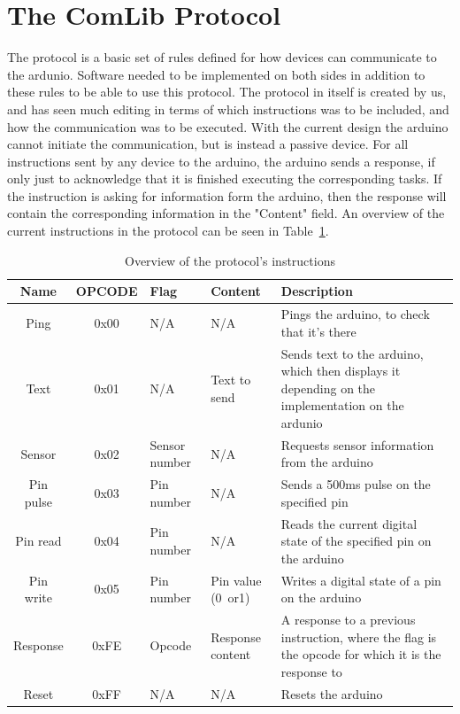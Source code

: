 \section{The ComLib Protocol}

The protocol is a basic set of rules defined for how devices can communicate to the ardunio. Software needed to be implemented on both sides in addition to these rules to be able to use this protocol. The protocol in itself is created by us, and has seen much editing in terms of which instructions was to be included, and how the communication was to be executed. With the current design the arduino cannot initiate the communication, but is instead a passive device. For all instructions sent by any device to the arduino, the arduino sends a response, if only just to acknowledge that it is finished executing the corresponding tasks. If the instruction is asking for information form the arduino, then the response will contain the corresponding information in the "Content" field. An overview of the current instructions in the protocol can be seen in Table~\ref{tbl:opcodes}.

\begin{table}
	\begin{tabular}{ | c | c | p{1.5cm} | p{1.7cm} | p{6cm} |}
		\hline
		\textbf{Name} & \textbf{OPCODE} & \textbf{Flag} & \textbf{Content} & \textbf{Description} \\ \hline
		Ping & 0x00 & N/A & N/A & Pings the arduino, to check that it's there \\ \hline
		Text & 0x01 & N/A & Text to send & Sends text to the arduino, which then displays it depending on the implementation on the ardunio \\ \hline
		Sensor & 0x02 & Sensor number & N/A & Requests sensor information from the arduino \\ \hline
		Pin pulse & 0x03 & Pin number & N/A & Sends a 500ms pulse on the specified pin \\ \hline
		Pin read & 0x04 & Pin number & N/A & Reads the current digital state of the specified pin on the arduino \\ \hline
		Pin write & 0x05 & Pin number & Pin value (0~or1) & Writes a digital state of a pin on the arduino \\ \hline
		Response & 0xFE & Opcode & Response content & A response to a previous instruction, where the flag is the opcode for which it is the response to \\ \hline
		Reset & 0xFF & N/A & N/A & Resets the arduino \\ \hline
	\end{tabular}
	\caption{Overview of the protocol's instructions}
	\label{tbl:opcodes}
\end{table}

